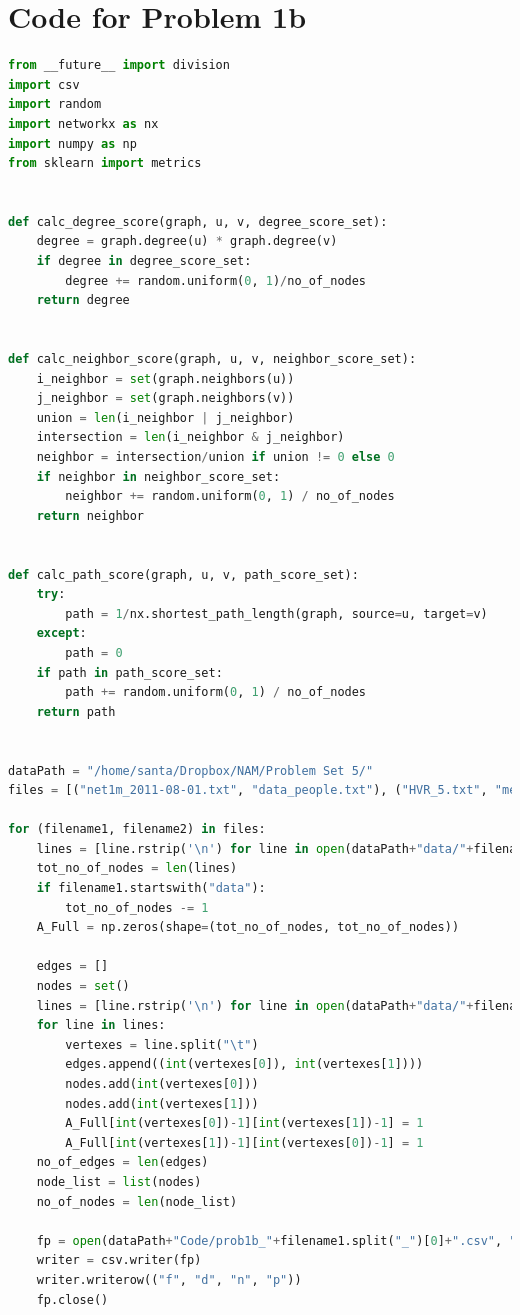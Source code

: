 \documentclass{article}
\begin{document}
\section*{Code for Problem 1b}
\begin{lstlisting}[language=Python, breaklines=true]
from __future__ import division
import csv
import random
import networkx as nx
import numpy as np
from sklearn import metrics


def calc_degree_score(graph, u, v, degree_score_set):
    degree = graph.degree(u) * graph.degree(v)
    if degree in degree_score_set:
        degree += random.uniform(0, 1)/no_of_nodes
    return degree


def calc_neighbor_score(graph, u, v, neighbor_score_set):
    i_neighbor = set(graph.neighbors(u))
    j_neighbor = set(graph.neighbors(v))
    union = len(i_neighbor | j_neighbor)
    intersection = len(i_neighbor & j_neighbor)
    neighbor = intersection/union if union != 0 else 0
    if neighbor in neighbor_score_set:
        neighbor += random.uniform(0, 1) / no_of_nodes
    return neighbor


def calc_path_score(graph, u, v, path_score_set):
    try:
        path = 1/nx.shortest_path_length(graph, source=u, target=v)
    except:
        path = 0
    if path in path_score_set:
        path += random.uniform(0, 1) / no_of_nodes
    return path


dataPath = "/home/santa/Dropbox/NAM/Problem Set 5/"
files = [("net1m_2011-08-01.txt", "data_people.txt"), ("HVR_5.txt", "metadata_CysPoLV.txt")]

for (filename1, filename2) in files:
    lines = [line.rstrip('\n') for line in open(dataPath+"data/"+filename2)]
    tot_no_of_nodes = len(lines)
    if filename1.startswith("data"):
        tot_no_of_nodes -= 1
    A_Full = np.zeros(shape=(tot_no_of_nodes, tot_no_of_nodes))
    
    edges = []
    nodes = set()
    lines = [line.rstrip('\n') for line in open(dataPath+"data/"+filename1)]
    for line in lines:
        vertexes = line.split("\t")
        edges.append((int(vertexes[0]), int(vertexes[1])))
        nodes.add(int(vertexes[0]))
        nodes.add(int(vertexes[1]))
        A_Full[int(vertexes[0])-1][int(vertexes[1])-1] = 1
        A_Full[int(vertexes[1])-1][int(vertexes[0])-1] = 1
    no_of_edges = len(edges)
    node_list = list(nodes)
    no_of_nodes = len(node_list)
    
    fp = open(dataPath+"Code/prob1b_"+filename1.split("_")[0]+".csv", "wt")
    writer = csv.writer(fp)
    writer.writerow(("f", "d", "n", "p"))
    fp.close()
    

\end{lstlisting}
\end{document}
